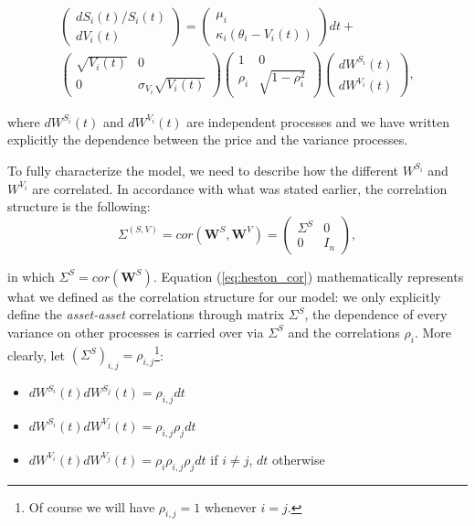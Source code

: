  \begin{multline}
 \label{eq:mv_heston}
\begin{pmatrix}
	dS_i(t) / S_i(t)\\
	dV_i(t)
\end{pmatrix}
= \begin{pmatrix}
\mu_i\\
\kappa_i (\theta_i - V_i(t))
\end{pmatrix}
dt  +\\ \begin{pmatrix}
\sqrt{V_i(t)} & 0 \\
0 & \sigma_{V_i} \sqrt{V_i(t)} 
\end{pmatrix}
\begin{pmatrix}
1 & 0 \\
 \rho_i & \sqrt{1-\rho_i^2} 
\end{pmatrix}
\begin{pmatrix}
dW^{S_i}(t)\\
dW^{V_i }(t)
\end{pmatrix},
\end{multline}

where $dW^{S_i}(t)$ and $dW^{V_i}(t)$ are independent processes and we have written explicitly the dependence between the price and the variance processes.

To fully characterize the model, we need to describe how the different $W^{S_i}$ and $W^{V_i}$ are correlated. In accordance with what was stated earlier, the correlation structure is the following:
\begin{equation}
\label{eq:heston_cor}
\Sigma^{(S,V)} = cor(\boldsymbol{W}^{S}, \boldsymbol{W}^{V}) = \begin{pmatrix}
\Sigma^{S} & 0 \\
0& I_n
\end{pmatrix},
\end{equation}

in which $\Sigma^S = cor(\boldsymbol{W}^{S})$.
Equation (\ref{eq:heston_cor}) mathematically represents what we defined as the correlation structure for our model: we only explicitly define the \textit{asset-asset} correlations through matrix $\Sigma^S$, the dependence of every variance  on other processes is carried over via $\Sigma^S$ and the correlations $\rho_i$.
More clearly, let $(\Sigma^S)_{i,j} = \rho_{i,j}$\footnote{Of course we will have $\rho_{i,j} = 1 $ whenever $i=j$.}:
\begin{itemize}
	\item $dW^{S_i}(t) dW^{S_j}(t) = \rho_{i,j} dt$
	\item $dW^{S_i}(t) dW^{V_j}(t) = \rho_{i,j} \rho_j dt$
	\item $dW^{V_i}(t) dW^{V_j}(t) = \rho_i \rho_{i,j}\rho_j dt $ if $i\neq j$, $dt$ otherwise
\end{itemize}


